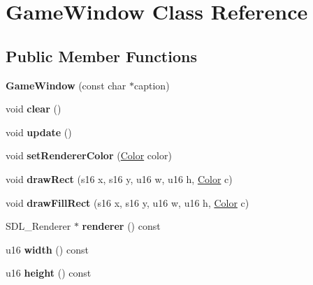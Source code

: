 \hypertarget{classGameWindow}{\section{Game\-Window Class Reference}
\label{classGameWindow}
}
\subsection*{Public Member Functions}
\begin{DoxyCompactItemize}
\item 
\hypertarget{classGameWindow_aa1de835c868c8333dc286e6740b1181a}{{\bfseries Game\-Window} (const char $\ast$caption)}\label{classGameWindow_aa1de835c868c8333dc286e6740b1181a}

\item 
\hypertarget{classGameWindow_afeef7d049b4838c1c112c2be09fe1cd1}{void {\bfseries clear} ()}\label{classGameWindow_afeef7d049b4838c1c112c2be09fe1cd1}

\item 
\hypertarget{classGameWindow_a91e9584fa74547af5f20243bd4a13459}{void {\bfseries update} ()}\label{classGameWindow_a91e9584fa74547af5f20243bd4a13459}

\item 
\hypertarget{classGameWindow_adf76f1d7845fb286d03d68f6a2d3a981}{void {\bfseries set\-Renderer\-Color} (\hyperlink{classColor}{Color} color)}\label{classGameWindow_adf76f1d7845fb286d03d68f6a2d3a981}

\item 
\hypertarget{classGameWindow_aa7cdca538ac9178d7cab420bc40b031b}{void {\bfseries draw\-Rect} (s16 x, s16 y, u16 w, u16 h, \hyperlink{classColor}{Color} c)}\label{classGameWindow_aa7cdca538ac9178d7cab420bc40b031b}

\item 
\hypertarget{classGameWindow_af039273de220d646d7ef889fd91ca23e}{void {\bfseries draw\-Fill\-Rect} (s16 x, s16 y, u16 w, u16 h, \hyperlink{classColor}{Color} c)}\label{classGameWindow_af039273de220d646d7ef889fd91ca23e}

\item 
\hypertarget{classGameWindow_a11f977a749d28dcf778b8fcda71c2930}{S\-D\-L\-\_\-\-Renderer $\ast$ {\bfseries renderer} () const }\label{classGameWindow_a11f977a749d28dcf778b8fcda71c2930}

\item 
\hypertarget{classGameWindow_a40ed07c018823633cd99d06b754a8cc8}{u16 {\bfseries width} () const }\label{classGameWindow_a40ed07c018823633cd99d06b754a8cc8}

\item 
\hypertarget{classGameWindow_a63ecf0a006b298e9785d8aa8b5040cb3}{u16 {\bfseries height} () const }\label{classGameWindow_a63ecf0a006b298e9785d8aa8b5040cb3}

\end{DoxyCompactItemize}
